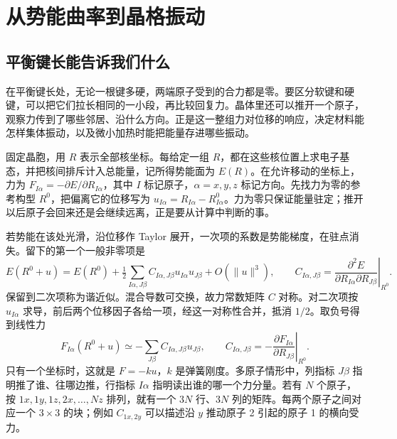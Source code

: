 \chapter{从势能曲率到晶格振动}
\section{平衡键长能告诉我们什么}
在平衡键长处，无论一根键多硬，两端原子受到的合力都是零。要区分软键和硬键，可以把它们拉长相同的一小段，再比较回复力。晶体里还可以推开一个原子，观察力传到了哪些邻居、沿什么方向。正是这一整组力对位移的响应，决定材料能怎样集体振动，以及微小加热时能把能量存进哪些振动。

固定晶胞，用 $R$ 表示全部核坐标。每给定一组 $R$，都在这些核位置上求电子基态，并把核间排斥计入总能量，记所得势能面为 $E(R)$。在允许移动的坐标上，力为 $F_{I\alpha}=-\partial E/\partial R_{I\alpha}$，其中 $I$ 标记原子，$\alpha=x,y,z$ 标记方向。先找力为零的参考构型 $R^0$，把偏离它的位移写为 $u_{I\alpha}=R_{I\alpha}-R^0_{I\alpha}$。力为零只保证能量驻定；推开以后原子会回来还是会继续远离，正是要从计算中判断的事。

若势能在该处光滑，沿位移作 Taylor 展开，一次项的系数是势能梯度，在驻点消失。留下的第一个一般非零项是
\begin{equation}\label{phonon:curvature}
E(R^0+u)=E(R^0)+\tfrac12\sum_{I\alpha,J\beta}C_{I\alpha,J\beta}u_{I\alpha}u_{J\beta}
+O(\|u\|^3),\qquad
C_{I\alpha,J\beta}=\left.\frac{\partial^2 E}{\partial R_{I\alpha}\partial R_{J\beta}}\right|_{R^0}.
\end{equation}
保留到二次项称为谐近似。混合导数可交换，故力常数矩阵 $C$ 对称。对二次项按 $u_{I\alpha}$ 求导，前后两个位移因子各给一项，经这一对称性合并，抵消 $1/2$。取负号得到线性力
\begin{equation}\label{phonon:linear-force}
F_{I\alpha}(R^0+u)\simeq-\sum_{J\beta} C_{I\alpha,J\beta}u_{J\beta},\qquad
C_{I\alpha,J\beta}=-\left.\frac{\partial F_{I\alpha}}{\partial R_{J\beta}}\right|_{R^0}.
\end{equation}
只有一个坐标时，这就是 $F=-ku$，$k$ 是弹簧刚度。多原子情形中，列指标 $J\beta$ 指明推了谁、往哪边推，行指标 $I\alpha$ 指明读出谁的哪一个力分量。若有 $N$ 个原子，按 $1x,1y,1z,2x,\ldots,Nz$ 排列，就有一个 $3N$ 行、$3N$ 列的矩阵。每两个原子之间对应一个 $3\times3$ 的块；例如 $C_{1x,2y}$ 可以描述沿 $y$ 推动原子 2 引起的原子 1 的横向受力。

